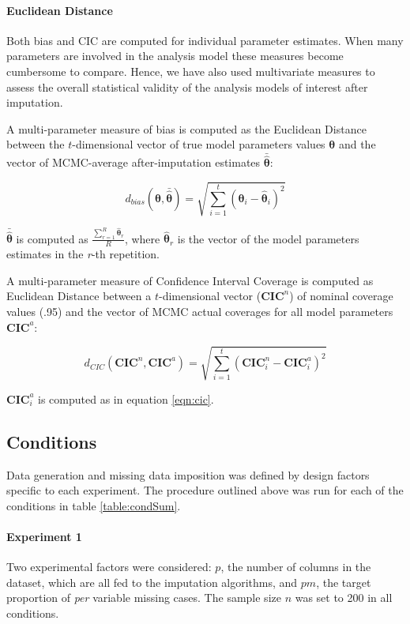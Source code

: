 	\paragraph{Euclidean Distance}
	Both bias and CIC are computed for individual parameter estimates. 
	When many parameters are involved in the analysis model these measures become cumbersome to compare.
	Hence, we have also used multivariate measures to assess the overall statistical validity of the analysis 
	models of interest after imputation.

	A multi-parameter measure of bias is computed as the Euclidean Distance between the $t$-dimensional vector of
	true model parameters values $\bm{\theta}$ and the vector of MCMC-average after-imputation estimates 
	$\bar{\hat{\bm{\theta}}}$:

	\begin{equation} \label{eqn:ed}
		d_{bias}(\bm{\theta},\bar{\hat{\bm{\theta}}}) =  
			\sqrt{ \sum_{i=1}^{t} (\bm{\theta}_i - \hat{\bm{\theta}}_i)^2 }
	\end{equation}
	
	$\bar{\hat{\bm{\theta}}}$ is computed as $\frac{ \sum_{r=1}^{R} \hat{\bm{\theta}}_r }{R}$,
	where $\hat{\bm{\theta}}_r$ is the vector of the model parameters estimates in the \emph{r}-th repetition.

	A multi-parameter measure of Confidence Interval Coverage is computed as Euclidean Distance between a 
	$t$-dimensional vector ($\bm{CIC}^{n}$) of nominal coverage values (.95) and the vector of MCMC actual
	coverages for all model parameters $\bm{CIC}^{a}$:

	\begin{equation} \label{eqn:ed}
		d_{CIC}(\bm{CIC}^{n}, \bm{CIC}^{a}) =  
			\sqrt{ \sum_{i=1}^{t} (\bm{CIC}^{n}_i - \bm{CIC}^{a}_i)^2 }
	\end{equation}
	
	$\bm{CIC}^{a}_i$ is computed as in equation \ref{eqn:cic}.

\subsection{Conditions}
	
	Data generation and missing data imposition was defined by design factors specific to each experiment.
	The procedure outlined above was run for each of the conditions in table \ref{table:condSum}.

	\paragraph{Experiment 1}
	Two experimental factors were considered: $p$, the number of columns in the dataset, which 
	are all fed to the imputation algorithms, and $pm$, the target proportion of \emph{per} variable missing cases.
	The sample size $n$ was set to 200 in all conditions.

